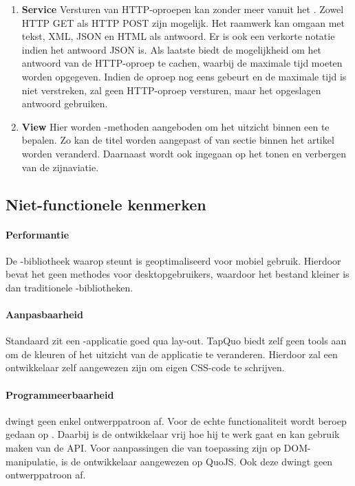 \begin{enumerate}
\item \textbf{Service }
Versturen van HTTP-oproepen kan zonder meer vanuit het \lungo{}.
Zowel HTTP GET als HTTP POST zijn mogelijk.
Het raamwerk kan omgaan met tekst, XML, JSON en HTML als antwoord.
Er is ook een verkorte notatie indien het antwoord JSON is.
Als laatste biedt \lungo{} de mogelijkheid om het antwoord van de HTTP-oproep te cachen, waarbij de maximale tijd moeten worden opgegeven.
Indien de oproep nog eens gebeurt en de maximale tijd is niet verstreken, zal \lungo{} geen HTTP-oproep versturen, maar het opgeslagen antwoord gebruiken.

\item \textbf{View }
Hier worden \js{}-methoden aangeboden om het uitzicht binnen een  te bepalen.
Zo kan de titel worden aangepast of van sectie binnen het artikel worden veranderd.
Daarnaast wordt ook ingegaan op het tonen en verbergen van de zijnaviatie.
 
\end{enumerate}

\subsection{Niet-functionele kenmerken}
\paragraph{Performantie}
De \js{}-bibliotheek waarop \lungo{} steunt is geoptimaliseerd voor mobiel gebruik.
Hierdoor bevat het geen methodes voor desktopgebruikers, waardoor het bestand kleiner is dan traditionele \js{}-bibliotheken.

\paragraph{Aanpasbaarheid}
\label{sec:lungo-aanpasbaarheid}
Standaard zit een \lungo{}-applicatie goed qua lay-out.
TapQuo biedt zelf geen tools aan om de kleuren of het uitzicht van de applicatie te veranderen.
Hierdoor zal een ontwikkelaar zelf aangewezen zijn om eigen CSS-code te schrijven.

\paragraph{Programmeerbaarheid}
\label{sec:lungo-programeerbaarheid}
\lungo{} dwingt geen enkel ontwerppatroon af.
Voor de echte functionaliteit wordt beroep gedaan op \js{}.
Daarbij is de ontwikkelaar vrij hoe hij te werk gaat en kan gebruik maken van de \lungo{} API. 
Voor aanpassingen die van toepassing zijn op DOM-manipulatie, is de ontwikkelaar aangewezen op QuoJS.
Ook deze dwingt geen ontwerppatroon af.

